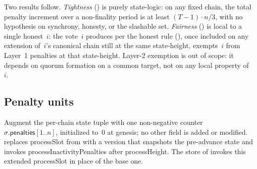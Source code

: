 \documentclass{article}
\newcommand{\penalties}{\mathsf{penalties}}
\newcommand{\processSlot}{\textsf{processSlot}\xspace}
\newcommand{\processHeight}{\textsf{processHeight}\xspace}
\newcommand{\processInactivityPenalties}{\textsf{processInactivityPenalties}\xspace}
\theoremstyle{plain}
\theoremstyle{definition}
\theoremstyle{remark}
\begin{document}
Two results follow.
\emph{Tightness} () is purely state-logic: on any fixed chain, the total penalty increment over a non-finality period is at least $(T-1) \cdot n/3$, with no hypothesis on synchrony, honesty, or the slashable set.
\emph{Fairness} () is local to a single honest~$i$: the vote~$i$ produces per the honest rule (), once included on any extension of~$i$'s canonical chain still at the same state-height, exempts~$i$ from Layer~1 penalties at that state-height.
Layer-2 exemption is out of scope: it depends on quorum formation on a common target, not on any local property of~$i$.

\subsection{Penalty units}

Augment the per-chain state tuple with one non-negative counter $\sigma.\penalties[1..n]$, initialized to~$0$ at genesis; no other field is added or modified.
 replaces \processSlot from  with a version that snapshots the pre-advance state and invokes \processInactivityPenalties after \processHeight.
The store of  invokes this extended \processSlot in place of the base one.
\end{document}
